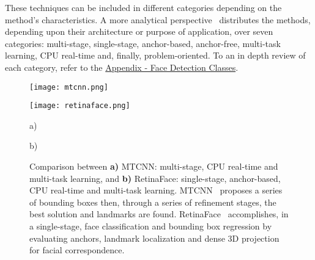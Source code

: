 \documentclass[class=report, crop=false, a4paper, 12pt]{standalone}
\begin{document}
\par These techniques can be included in different categories depending on the method's characteristics. A more analytical perspective~\autocite{duElementsEndtoendDeep2022} distributes the methods, depending upon their architecture or purpose of application, over seven categories: multi-stage, single-stage, anchor-based, anchor-free, multi-task learning, CPU real-time and, finally, problem-oriented. To an in depth review of each category, refer to the \hyperref[sec:face_detection_appendix]{Appendix - Face Detection Classes}.

\vspace{0.5\baselineskip}
\begin{figure}[h!]
    \centering
    \begin{minipage}[c]{0.38\textwidth}
      \centering
      \texttt{[image: mtcnn.png]}
      \label{fig:mtcnn}
    \end{minipage}
    \hspace{0.5cm}
    \begin{minipage}[c]{0.52\textwidth}
      \centering
      \texttt{[image: retinaface.png]}
      \label{fig:retinaface}
    \end{minipage} 
    \begin{minipage}{0.4\textwidth}
        \vspace{-0.5cm}
        \centering
        \footnotesize a)
    \end{minipage}
    \hfill
    \begin{minipage}{0.4\textwidth}
        \vspace{-0.5cm}
        \centering
        \footnotesize b)
    \end{minipage}
    \vspace{-0.4cm}
    \caption[Comparison between MTCNN and RetinaFace.]{Comparison between \textbf{a)} MTCNN: multi-stage, CPU real-time and multi-task learning, and \textbf{b)} RetinaFace: single-stage, anchor-based, CPU real-time and multi-task learning. MTCNN~\autocite{zhangJointFaceDetection2016a} proposes a series of bounding boxes then, through a series of refinement stages, the best solution and landmarks are found. RetinaFace~\autocite{dengRetinaFaceSinglestageDense2019} accomplishes, in a single-stage, face classification and bounding box regression by evaluating anchors, landmark localization and dense 3D projection for facial correspondence.}
    \label{fig:mtcnn vs retinaface}
\end{figure}
\end{document}

